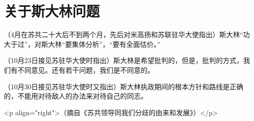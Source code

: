 \section[关于斯大林问题（一九五六年）]{关于斯大林问题}


（4月在苏共二十大后不到两个月，先后对米高扬和苏联驻华大使指出）斯大林“功大于过”，对斯大林“要集体分析”，“要有全面估价。”

（10月23日接见苏驻华大使时指出）斯大林是希望批判的，但是，批判的方式，我们有不同意见。还有若干问题，我们是不同意的。

（10月30日接见苏驻华大使时又指出）斯大林执政期间的根本方针和路线是正确的，不能用对待敌人的办法来对待自己的同志。

<p align="right">（摘自《苏共领导同我们分歧的由来和发展》）</p>


